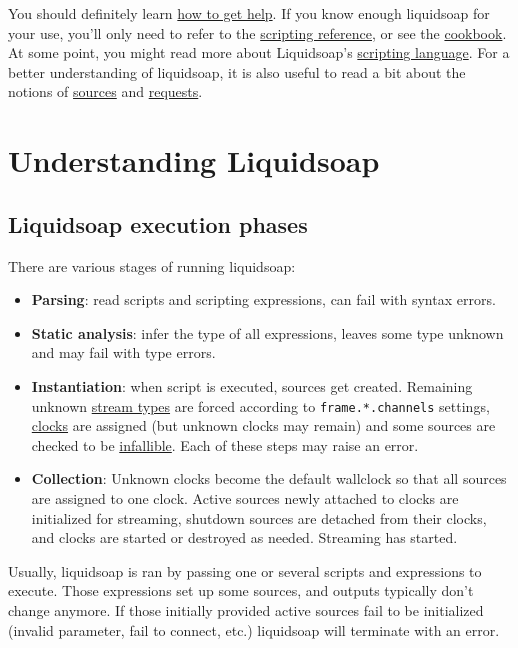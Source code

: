 \documentclass{book}
\begin{document}
You should definitely learn \href{help.html}{how to get help}.  If you know
enough liquidsoap for your use, you'll only need to refer to the
\href{reference.html}{scripting reference}, or see the
\href{cookbook.html}{cookbook}.  At some point, you might read more about
Liquidsoap's \href{language.html}{scripting language}.  For a better
understanding of liquidsoap, it is also useful to read a bit about the notions
of \href{sources.html}{sources} and \href{requests.html}{requests}.



\chapter{Understanding Liquidsoap}
\section{Liquidsoap execution phases}
There are various stages of running liquidsoap:

\begin{itemize}
\item \textbf{Parsing}: read scripts and scripting expressions, can fail with syntax errors.
\item \textbf{Static analysis}: infer the type of all expressions, leaves some type unknown and may fail with type errors.
\item \textbf{Instantiation}: when script is executed, sources get created. Remaining unknown \href{stream_contents.html}{stream types} are forced according to \verb+frame.*.channels+ settings, \href{clock.html}{clocks} are assigned (but unknown clocks may remain) and some sources are checked to be \href{source.htmls}{infallible}. Each of these steps may raise an error.
\item \textbf{Collection}: Unknown clocks become the default wallclock so that all sources are assigned to one clock. Active sources newly attached to clocks are initialized for streaming, shutdown sources are detached from their clocks, and clocks are started or destroyed as needed. Streaming has started.

\end{itemize}
Usually, liquidsoap is ran by passing one or several scripts and expressions to execute. Those expressions set up some sources, and outputs typically don't change anymore. If those initially provided active sources fail to be initialized (invalid parameter, fail to connect, etc.) liquidsoap will terminate with an error.
\end{document}
